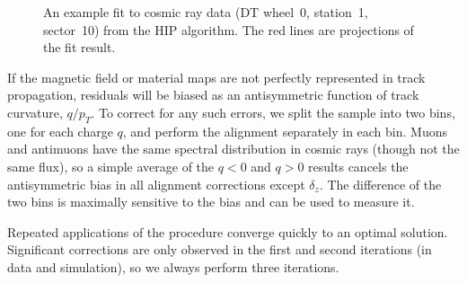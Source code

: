 \begin{figure}
\begin{center}
\end{center}

\caption{An example fit to cosmic ray data (DT wheel~0, station~1, sector~10) from the HIP algorithm.  The red lines are projections of the fit result. \label{fig:examplefit}}
\end{figure}

If the magnetic field or material maps are not perfectly represented
in track propagation, residuals will be biased as an antisymmetric
function of track curvature, $q/p_T$.  To correct for any such errors,
we split the sample into two bins, one for each charge $q$, and
perform the alignment separately in each bin.  Muons and antimuons
have the same spectral distribution in cosmic rays (though not the
same flux), so a simple average of the $q<0$ and $q>0$ results cancels the
antisymmetric bias in all alignment corrections except $\delta_z$.
The difference of the two bins is maximally sensitive to the bias and
can be used to measure it.

Repeated applications of the procedure converge quickly to an optimal
solution.  Significant corrections are only observed in the first and
second iterations (in data and simulation), so we always perform three
iterations.

